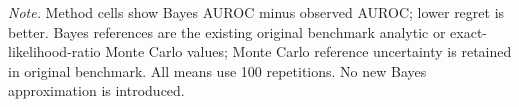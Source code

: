\noindent\textit{Note.} Method cells show Bayes AUROC minus observed AUROC; lower regret is better. Bayes references are the existing original benchmark analytic or exact-likelihood-ratio Monte Carlo values; Monte Carlo reference uncertainty is retained in original benchmark. All means use 100 repetitions. No new Bayes approximation is introduced.
\par\endgroup
